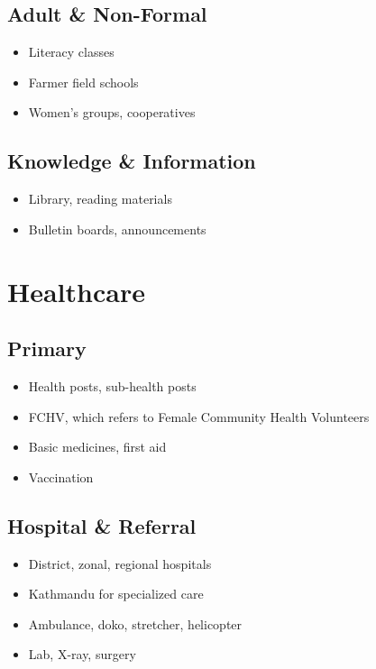 \documentclass[11pt,a4paper]{article}
\begin{document}
\subsection{Adult \& Non-Formal}
\begin{itemize}
    \item Literacy classes
    \item Farmer field schools
    \item Women's groups, cooperatives
\end{itemize}

\subsection{Knowledge \& Information}
\begin{itemize}
    \item Library, reading materials
    \item Bulletin boards, announcements
\end{itemize}

\section{Healthcare}

\subsection{Primary}
\begin{itemize}
    \item Health posts, sub-health posts
    \item FCHV, which refers to Female Community Health Volunteers
    \item Basic medicines, first aid
    \item Vaccination
\end{itemize}

\subsection{Hospital \& Referral}
\begin{itemize}
    \item District, zonal, regional hospitals
    \item Kathmandu for specialized care
    \item Ambulance, doko, stretcher, helicopter
    \item Lab, X-ray, surgery
\end{itemize}
\end{document}

